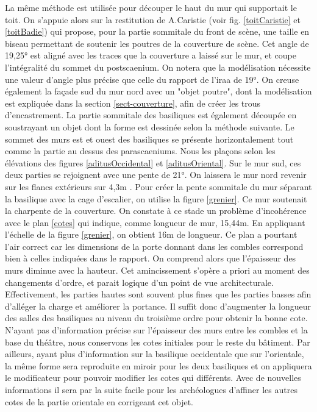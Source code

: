 La même méthode est utilisée pour découper le haut du mur qui supportait le toit. On s'appuie alors sur la restitution de A.Caristie (voir fig. \ref{toitCaristie} et \ref{toitBadie}) qui propose, pour la partie sommitale du front de scène, une taille en biseau permettant de soutenir les poutres de la couverture de scène. Cet angle de 19,25° est aligné avec les traces que la couverture a laissé sur le mur, et coupe l'intégralité du sommet du \gls{postscaenium}. On notera que la modélisation nécessite une valeur d'angle plus précise que celle du rapport de l'\gls{iraa} \cite[fig. 24]{orangeTxt} de 19°. On creuse également la façade sud du mur nord avec un "objet poutre", dont la modélisation est expliquée dans la section \ref{sect-couverture}, afin de créer les trous d'encastrement. La partie sommitale des \glspl{basilique} est également découpée en soustrayant un objet dont la forme est dessinée selon la méthode suivante. Le sommet des murs est et ouest des \glspl{basilique} se présente horizontalement tout comme la partie au dessus des \glspl{parascaenium}. Nous les plaçons selon les élévations des figures \ref{aditusOccidental} et \ref{aditusOriental}. Sur le mur sud, ces deux parties se rejoignent avec une pente de 21°. On laissera le mur nord revenir sur les flancs extérieurs sur 4,3m \cite[p. 38]{orangeTxt}. Pour créer la pente sommitale du mur séparant la \gls{basilique} avec la cage d'escalier, on utilise la figure \ref{grenier}. Ce mur soutenait la charpente de la couverture. On constate à ce stade un problème d'incohérence avec le plan \ref{cotes} qui indique, comme longueur de mur, 15,44m. En appliquant l'échelle de la figure \ref{grenier}, on obtient 16m de longueur. Ce plan a pourtant l'air correct car les dimensions de la porte donnant dans les combles correspond bien à celles indiquées dans le rapport. On comprend alors que l'épaisseur des murs diminue avec la hauteur. Cet amincissement s'opère a priori au moment des changements d'ordre, et parait logique d'un point de vue architecturale. Effectivement, les parties hautes sont souvent plus fines que les parties basses afin d'alléger la charge et améliorer la portance. Il suffit donc d'augmenter la longueur des salles des \glspl{basilique} au niveau du troisième ordre pour obtenir la bonne cote. N'ayant pas d'information précise sur l'épaisseur des murs entre les combles et la base du théâtre, nous conservons les cotes initiales pour le reste du bâtiment. Par ailleurs, ayant plus d'information sur la basilique occidentale que sur l'orientale, la même forme sera reproduite en miroir pour les deux basiliques et on appliquera le modificateur pour pouvoir modifier les cotes qui différents. Avec de nouvelles informations il sera par la suite facile pour les archéologues d'affiner les autres cotes de la partie orientale en corrigeant cet objet.

